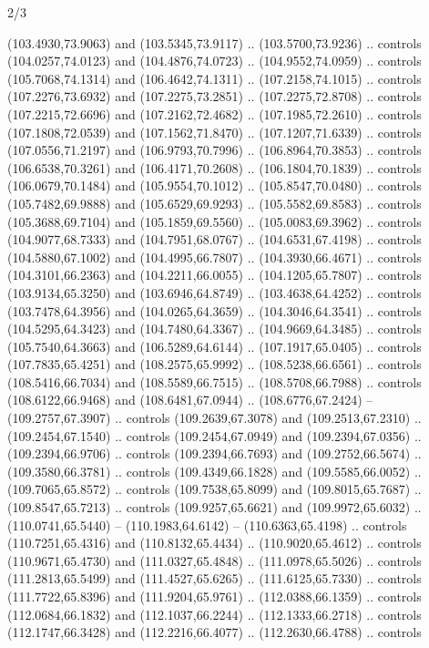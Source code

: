 \begin{flagdescription}{2/3}
\begin{scope}[shift={(0.5\flaglength,0.5)},scale=\flagwidth/320]
\begin{scope}[y=0.8pt, x=0.8pt, yscale=-1,shift={(-118.3,-146)}]
  (103.4930,73.9063) and (103.5345,73.9117) .. (103.5700,73.9236) .. controls
  (104.0257,74.0123) and (104.4876,74.0723) .. (104.9552,74.0959) .. controls
  (105.7068,74.1314) and (106.4642,74.1311) .. (107.2158,74.1015) .. controls
  (107.2276,73.6932) and (107.2275,73.2851) .. (107.2275,72.8708) .. controls
  (107.2215,72.6696) and (107.2162,72.4682) .. (107.1985,72.2610) .. controls
  (107.1808,72.0539) and (107.1562,71.8470) .. (107.1207,71.6339) .. controls
  (107.0556,71.2197) and (106.9793,70.7996) .. (106.8964,70.3853) .. controls
  (106.6538,70.3261) and (106.4171,70.2608) .. (106.1804,70.1839) .. controls
  (106.0679,70.1484) and (105.9554,70.1012) .. (105.8547,70.0480) .. controls
  (105.7482,69.9888) and (105.6529,69.9293) .. (105.5582,69.8583) .. controls
  (105.3688,69.7104) and (105.1859,69.5560) .. (105.0083,69.3962) .. controls
  (104.9077,68.7333) and (104.7951,68.0767) .. (104.6531,67.4198) .. controls
  (104.5880,67.1002) and (104.4995,66.7807) .. (104.3930,66.4671) .. controls
  (104.3101,66.2363) and (104.2211,66.0055) .. (104.1205,65.7807) .. controls
  (103.9134,65.3250) and (103.6946,64.8749) .. (103.4638,64.4252) .. controls
  (103.7478,64.3956) and (104.0265,64.3659) .. (104.3046,64.3541) .. controls
  (104.5295,64.3423) and (104.7480,64.3367) .. (104.9669,64.3485) .. controls
  (105.7540,64.3663) and (106.5289,64.6144) .. (107.1917,65.0405) .. controls
  (107.7835,65.4251) and (108.2575,65.9992) .. (108.5238,66.6561) .. controls
  (108.5416,66.7034) and (108.5589,66.7515) .. (108.5708,66.7988) .. controls
  (108.6122,66.9468) and (108.6481,67.0944) .. (108.6776,67.2424) --
  (109.2757,67.3907) .. controls (109.2639,67.3078) and (109.2513,67.2310) ..
  (109.2454,67.1540) .. controls (109.2454,67.0949) and (109.2394,67.0356) ..
  (109.2394,66.9706) .. controls (109.2394,66.7693) and (109.2752,66.5674) ..
  (109.3580,66.3781) .. controls (109.4349,66.1828) and (109.5585,66.0052) ..
  (109.7065,65.8572) .. controls (109.7538,65.8099) and (109.8015,65.7687) ..
  (109.8547,65.7213) .. controls (109.9257,65.6621) and (109.9972,65.6032) ..
  (110.0741,65.5440) -- (110.1983,64.6142) -- (110.6363,65.4198) .. controls
  (110.7251,65.4316) and (110.8132,65.4434) .. (110.9020,65.4612) .. controls
  (110.9671,65.4730) and (111.0327,65.4848) .. (111.0978,65.5026) .. controls
  (111.2813,65.5499) and (111.4527,65.6265) .. (111.6125,65.7330) .. controls
  (111.7722,65.8396) and (111.9204,65.9761) .. (112.0388,66.1359) .. controls
  (112.0684,66.1832) and (112.1037,66.2244) .. (112.1333,66.2718) .. controls
  (112.1747,66.3428) and (112.2216,66.4077) .. (112.2630,66.4788) .. controls

\end{scope}
\end{scope}
\end{flagdescription}
